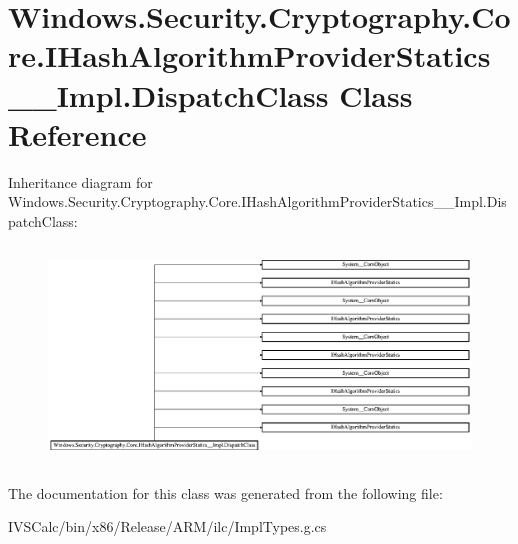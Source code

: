 \hypertarget{class_windows_1_1_security_1_1_cryptography_1_1_core_1_1_i_hash_algorithm_provider_statics_____impl_1_1_dispatch_class}{}\section{Windows.\+Security.\+Cryptography.\+Core.\+I\+Hash\+Algorithm\+Provider\+Statics\+\_\+\+\_\+\+Impl.\+Dispatch\+Class Class Reference}
\label{class_windows_1_1_security_1_1_cryptography_1_1_core_1_1_i_hash_algorithm_provider_statics_____impl_1_1_dispatch_class}
Inheritance diagram for Windows.\+Security.\+Cryptography.\+Core.\+I\+Hash\+Algorithm\+Provider\+Statics\+\_\+\+\_\+\+Impl.\+Dispatch\+Class\+:\begin{figure}[H]
\begin{center}
\leavevmode
\includegraphics[height=5.811321cm]{class_windows_1_1_security_1_1_cryptography_1_1_core_1_1_i_hash_algorithm_provider_statics_____impl_1_1_dispatch_class}
\end{center}
\end{figure}


The documentation for this class was generated from the following file\+:\begin{DoxyCompactItemize}
\item 
I\+V\+S\+Calc/bin/x86/\+Release/\+A\+R\+M/ilc/Impl\+Types.\+g.\+cs\end{DoxyCompactItemize}
